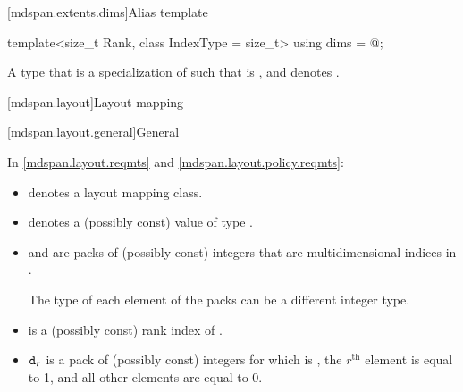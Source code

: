 [mdspan.extents.dims]{Alias template }

%
\begin{itemdecl}
template<size_t Rank, class IndexType = size_t>
  using dims = @\seebelow@;
\end{itemdecl}

\begin{itemdescr}
\pnum
\result
A type  that is a specialization of 
such that  is , and
 denotes .
\end{itemdescr}

[mdspan.layout]{Layout mapping}

[mdspan.layout.general]{General}

\pnum
In \ref{mdspan.layout.reqmts} and \ref{mdspan.layout.policy.reqmts}:

\begin{itemize}
\item
{} denotes a layout mapping class.

\item
{} denotes a (possibly const) value of type .

\item
{} and  are packs of (possibly const) integers
that are multidimensional indices in .
\begin{note}
The type of each element of the packs can be a different integer type.
\end{note}

\item
{} is a (possibly const) rank index of .

\item
$\texttt{\protect d}_r$ is a pack of (possibly const) integers
for which  is ,
the $r^\text{th}$ element is equal to 1, and
all other elements are equal to 0.
\end{itemize}

